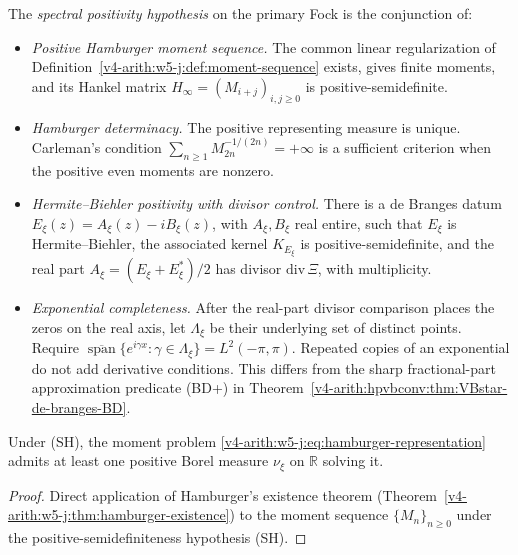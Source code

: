 \begin{definition}
\label{v4-arith:w5-j:def:spectral-package}
The \emph{spectral positivity hypothesis}
on the primary Fock is the conjunction of:
\begin{itemize}
\item[(SH)] \emph{Positive Hamburger moment sequence.}
The common linear regularization of
Definition~\ref{v4-arith:w5-j:def:moment-sequence} exists, gives finite
moments, and its Hankel matrix \(H_\infty=(M_{i+j})_{i,j\geq0}\)
is positive-semidefinite.
\item[(Det)] \emph{Hamburger determinacy.}
The positive representing measure is unique. Carleman's condition
\(\sum_{n\geq1}M_{2n}^{-1/(2n)}=+\infty\) is a sufficient
criterion when the positive even moments are nonzero.
\item[(HB\(^{+}\))] \emph{Hermite--Biehler positivity with divisor
control.} There is a de Branges datum
\(E_{\xi}(z)=A_{\xi}(z)-iB_{\xi}(z)\), with \(A_{\xi},B_{\xi}\)
real entire, such that \(E_{\xi}\) is Hermite--Biehler, the
associated kernel \(K_{E_{\xi}}\) is positive-semidefinite, and the
real part \(A_{\xi}=(E_{\xi}+E_{\xi}^{*})/2\) has divisor
\(\mathrm{div}\,\Xi\), with multiplicity.
\item[\((\mathrm{EC}_\pi)\)] \emph{Exponential completeness.}
After the real-part divisor comparison places the zeros on the real
axis, let \(\Lambda_\xi\) be their underlying set of distinct points.
Require \(\overline{\operatorname{span}}\{e^{i\gamma x}:
\gamma\in\Lambda_\xi\}=L^2(-\pi,\pi)\).
Repeated copies of an exponential do not add derivative conditions.
This differs from the sharp fractional-part approximation predicate
(BD+) in Theorem~\ref{v4-arith:hpvbconv:thm:VBstar-de-branges-BD}.
\end{itemize}
\end{definition}

\begin{proposition}
\label{v4-arith:w5-j:prop:SH-positive-measure}
Under (SH), the moment problem
\eqref{v4-arith:w5-j:eq:hamburger-representation} admits at least
one positive Borel measure \(\nu_{\xi}\) on \(\mathbb{R}\) solving it.
\end{proposition}

\begin{proof}
Direct application of Hamburger's existence theorem
(Theorem~\ref{v4-arith:w5-j:thm:hamburger-existence}) to the moment
sequence \(\{M_{n}\}_{n\geq 0}\) under the positive-semidefiniteness
hypothesis (SH).
\end{proof}

